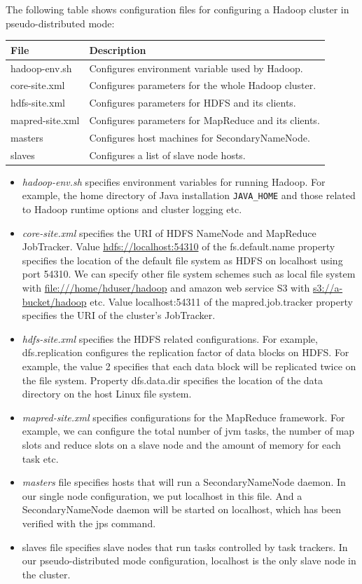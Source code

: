 The following table shows configuration files for configuring a Hadoop cluster in pseudo-distributed mode:
\begin{table}[h]
  \centering
\begin{tabular}{ll}  
    \toprule
    \textbf{File} & \textbf{Description} \\ \midrule
    hadoop-env.sh & Configures environment variable used by Hadoop. \\
    core-site.xml & Configures parameters for the whole Hadoop cluster. \\
    hdfs-site.xml & Configures parameters for HDFS and its clients. \\
    mapred-site.xml & Configures parameters for MapReduce and its clients. \\
    masters & Configures host machines for SecondaryNameNode. \\
    slaves & Configures a list of slave node hosts. \\ \bottomrule
  \end{tabular}
\end{table}

\begin{itemize}
  \item \emph{hadoop-env.sh} specifies environment variables for running Hadoop. For example, the home directory of Java installation \verb|JAVA_HOME| and those related to Hadoop runtime options and cluster logging etc.
  \item \emph{core-site.xml} specifies the URI of HDFS NameNode and MapReduce JobTracker. Value \url{hdfs://localhost:54310} of the fs.default.name property specifies the location of the default file system as HDFS on localhost using port 54310. We can specify other file system schemes such as local file system with \url{file:///home/hduser/hadoop} and amazon web service S3 with \url{s3://a-bucket/hadoop} etc. Value localhost:54311 of the mapred.job.tracker property specifies the URI of the cluster's JobTracker.
  \item \emph{hdfs-site.xml} specifies the HDFS related configurations. For example, dfs.replication configures the replication factor of data blocks on HDFS. For example, the value 2 specifies that each data block will be replicated twice on the file system. Property dfs.data.dir specifies the location of the data directory on the host Linux file system.
  \item \emph{mapred-site.xml} specifies configurations for the MapReduce framework. For example, we can configure the total number of jvm tasks, the number of map slots and reduce slots on a slave node and the amount of memory for each task etc.
  \item \emph{masters} file specifies hosts that will run a SecondaryNameNode daemon. In our single node configuration, we put localhost in this file. And a SecondaryNameNode daemon will be started on localhost, which has been verified with the jps command.
  \item slaves file specifies slave nodes that run tasks controlled by task trackers. In our pseudo-distributed mode configuration, localhost is the only slave node in the cluster.
\end{itemize}

